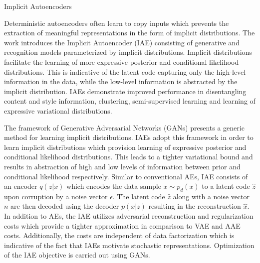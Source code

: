 \documentclass[11pt,letterpaper]{article}
\begin{document}
\begin{center}
  \large{Implicit Autoencoders}
\end{center}

Deterministic autoencoders often learn to copy inputs which prevents the extraction of meaningful representations in the form of implicit distributions. The work introduces the Implicit Autoencoder (IAE) consisting of generative and recognition models parameterized by implicit distributions. Implicit distributions facilitate the learning of more expressive posterior and conditional likelihood distributions. This is indicative of the latent code capturing only the high-level information in the data, while the low-level information is abstracted by the implicit distribution. IAEs demonstrate improved performance in disentangling content and style information, clustering, semi-supervised learning and learning of expressive variational distributions. 

The framework of Generative Adversarial Networks (GANs) presents a generic method for learning implicit distributions. IAEs adopt this framework in order to learn implicit distributions which provision learning of expressive posterior and conditional likelihood distributions. This leads to a tighter variational bound and results in abstraction of high and low levels of information between prior and conditional likelihood respectively. Similar to conventional AEs, IAE consists of an encoder $q(z|x)$ which encodes the data sample $x \sim p_{d}(x)$ to a latent code $\hat{z}$ upon corruption by a noise vector $\epsilon$. The latent code $\hat{z}$ along with a noise vector $n$ are then decoded using the decoder $p(x|z)$ resulting in the reconstruction $\hat{x}$. In addition to AEs, the IAE utilizes adversarial reconstruction and regularization costs which provide a tighter approximation in comparison to VAE and AAE costs. Additionally, the costs are independent of data factorization which is indicative of the fact that IAEs motivate stochastic representations. Optimization of the IAE objective is carried out using GANs. 
\end{document}
